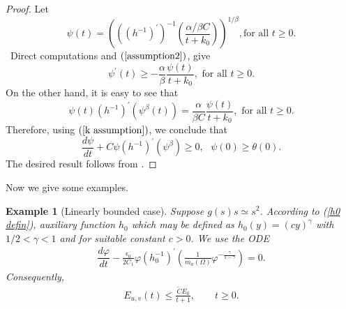 \documentclass[11pt,reqno]{amsart}
\theoremstyle{plain}
\newtheorem{example}{Example}
\numberwithin{equation}{section}
\numberwithin{equation}{section}
\begin{document}
\begin{proof}
Let 
\begin{equation*}
\psi \left( t\right) =\left( \left( \left( h^{-1}\right) ^{\prime }\right)
^{-1}\left( \frac{\alpha /\beta C}{t+k_{0}}\right) \right) ^{1/\beta },\text{
for all }t\geq 0.
\end{equation*}%
\ Direct computations and $\left( \ref{assumption2}\right) $, give%
\begin{equation*}
\psi ^{\prime }\left( t\right) \geq -\frac{\alpha }{\beta }\frac{\psi \left(
t\right) }{t+k_{0}},\text{ for all }t\geq 0.
\end{equation*}%
On the other hand, it is easy to see that%
\begin{equation*}
\psi \left( t\right) \left( h^{-1}\right) ^{\prime }\left( \psi ^{\beta
}\left( t\right) \right) =\frac{\alpha }{\beta C}\frac{\psi \left( t\right) 
}{t+k_{0}},\text{ for all }t\geq 0.
\end{equation*}%
Therefore, using $\left( \ref{k assumption}\right) $, we conclude that 
\begin{equation*}
\dfrac{d\psi }{dt}+C\psi \left( h^{-1}\right) ^{\prime }\left( \psi ^{\beta
}\right) \geq 0,\text{ }\psi \left( 0\right) \geq \theta \left( 0\right) .
\end{equation*}%
The desired result follows from \cite[Lemma 1]{daou jmaa}.
\end{proof}

Now we give some examples.

\begin{example}[Linearly bounded case]
Suppose $g\left( s\right) s\simeq s^{2}$. According to (\ref{h0 defin}),
auxiliary function $h_{0}$ which may be defined as $h_{0}(y)=(cy)^{\gamma }$
with $1/2<\gamma <1$ and for suitable constant $c>0$. We use the ODE 
\begin{equation*}
\begin{array}{l}
\dfrac{d\varphi }{dt}-\frac{\epsilon _{0}}{2C_{1}}\varphi \left(
h_{0}^{-1}\right) ^{\prime }\left( \frac{1}{m_{a}\left( \Omega \right) }%
\varphi ^{-\frac{\gamma }{1-\gamma }}\right) =0.%
\end{array}%
\end{equation*}%
Consequently, 
\begin{equation*}
\begin{array}{l}
E_{u,v}(t)\leq \frac{\tilde{C}E_{0}}{t+1},\qquad t\geq 0.%
\end{array}%
\end{equation*}
\end{example}
\end{document}

